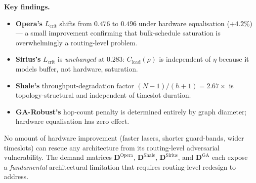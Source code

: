 \documentclass{article}
\begin{document}
    \textbf{Key findings.}
    \begin{itemize}
        \item \textbf{Opera's} $L_{\text{crit}}$ shifts from $0.476$ to $0.496$ under hardware equalisation ($+4.2\%$) --- a small improvement confirming that bulk-schedule saturation is overwhelmingly a routing-level problem.
        \item \textbf{Sirius's} $L_{\text{crit}}$ is \emph{unchanged} at $0.283$: $C_{\text{load}}(\rho)$ is independent of $\eta$ because it models buffer, not hardware, saturation.
        \item \textbf{Shale's} throughput-degradation factor $(N{-}1)/(h{+}1) = 2.67\times$ is topology-structural and independent of timeslot duration.
        \item \textbf{GA-Robust's} hop-count penalty is determined entirely by graph diameter; hardware equalisation has zero effect.
    \end{itemize}

    No amount of hardware improvement (faster lasers, shorter guard-bands, wider timeslots) can rescue any architecture from its routing-level adversarial vulnerability.  The demand matrices $\mathbf{D}^{\text{Opera}}$, $\mathbf{D}^{\text{Shale}}$, $\mathbf{D}^{\text{Sirius}}$, and $\mathbf{D}^{\text{GA}}$ each expose a \emph{fundamental} architectural limitation that requires routing-level redesign to address.
\end{document}
